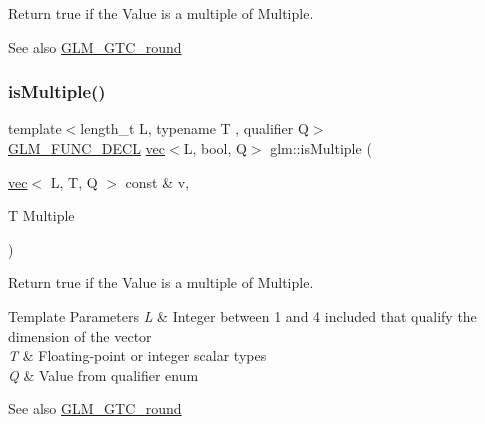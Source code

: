 Return true if the \textquotesingle{}Value\textquotesingle{} is a multiple of \textquotesingle{}Multiple\textquotesingle{}.

\begin{DoxySeeAlso}{See also}
\hyperlink{group__gtc__round}{G\+L\+M\+\_\+\+G\+T\+C\+\_\+round} 
\end{DoxySeeAlso}
\mbox{\label{group__gtc__round_ga354caf634ef333d9cb4844407416256a}} 
\subsubsection{\texorpdfstring{is\+Multiple()}{isMultiple()}\hspace{0.1cm}{\footnotesize\ttfamily [2/3]}}
{\footnotesize\ttfamily template$<$length\+\_\+t L, typename T , qualifier Q$>$ \\
\hyperlink{setup_8hpp_ab2d052de21a70539923e9bcbf6e83a51}{G\+L\+M\+\_\+\+F\+U\+N\+C\+\_\+\+D\+E\+CL} \hyperlink{structglm_1_1vec}{vec}$<$L, bool, Q$>$ glm\+::is\+Multiple (\begin{DoxyParamCaption}\item[{\hyperlink{structglm_1_1vec}{vec}$<$ L, T, Q $>$ const \&}]{v,  }\item[{T}]{Multiple }\end{DoxyParamCaption})}

Return true if the \textquotesingle{}Value\textquotesingle{} is a multiple of \textquotesingle{}Multiple\textquotesingle{}.


\begin{DoxyTemplParams}{Template Parameters}
{\em L} & Integer between 1 and 4 included that qualify the dimension of the vector \\
\hline
{\em T} & Floating-\/point or integer scalar types \\
\hline
{\em Q} & Value from qualifier enum\\
\hline
\end{DoxyTemplParams}
\begin{DoxySeeAlso}{See also}
\hyperlink{group__gtc__round}{G\+L\+M\+\_\+\+G\+T\+C\+\_\+round} 
\end{DoxySeeAlso}
\mbox{\label{group__gtc__round_gabb4360e38c0943d8981ba965dead519d}} 
